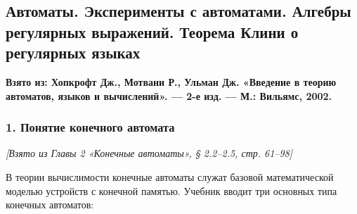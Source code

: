 \documentclass[a4paper,12pt]{article}
\begin{document}
\subsection{Автоматы. Эксперименты с автоматами. Алгебры регулярных выражений. Теорема Клини о регулярных языках}

\textbf{Взято из: Хопкрофт Дж., Мотвани Р., Ульман Дж. «Введение в теорию автоматов, языков и вычислений». — 2-е изд. — М.: Вильямс, 2002.}

\subsubsection*{1. Понятие конечного автомата}
\textit{[Взято из Главы 2 «Конечные автоматы», § 2.2–2.5, стр. 61–98]}

В теории вычислимости конечные автоматы служат базовой математической моделью устройств с конечной памятью. Учебник вводит три основных типа конечных автоматов:
\end{document}

